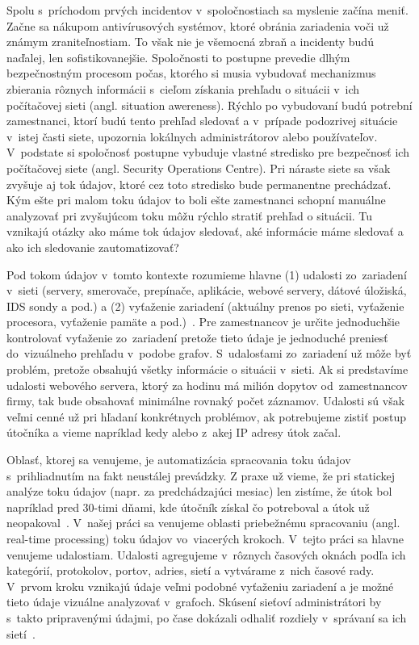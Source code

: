 \documentclass[thesismargins, thesislinespacing, openright, upjsfrontpage]{rnthesis}
\begin{document}
Spolu s~príchodom prvých incidentov v~spoločnostiach sa myslenie začína meniť. Začne sa nákupom antivírusových systémov, ktoré obránia zariadenia voči už známym zraniteľnostiam. To však nie je všemocná zbraň a incidenty budú naďalej, len sofistikovanejšie. Spoločnosti to postupne prevedie dlhým bezpečnostným procesom počas, ktorého si musia vybudovať mechanizmus zbierania rôznych informácii s~cieľom získania prehľadu o situácii v~ich počítačovej sieti (angl. situation awereness). Rýchlo po vybudovaní budú potrební zamestnanci, ktorí budú tento prehľad sledovať a v~prípade podozrivej situácie v~istej časti siete, upozornia lokálnych administrátorov alebo používateľov. V~podstate si spoločnosť postupne vybuduje vlastné stredisko pre bezpečnosť ich počítačovej siete (angl. Security Operations Centre). Pri náraste siete sa však zvyšuje aj tok údajov, ktoré cez toto stredisko bude permanentne prechádzať. Kým ešte pri malom toku údajov to boli ešte zamestnanci schopní manuálne analyzovať pri zvyšujúcom toku môžu rýchlo stratiť prehľad o situácii. Tu vznikajú otázky ako máme tok údajov sledovať, aké informácie máme sledovať a ako ich sledovanie zautomatizovať?

Pod tokom údajov v~tomto kontexte rozumieme hlavne (1) udalosti zo~zariadení v~sieti (servery, smerovače, prepínače, aplikácie, webové servery, dátové úložiská, IDS sondy a pod.) a (2) vyťaženie zariadení (aktuálny prenos po sieti, vyťaženie procesora, vyťaženie pamäte a pod.)~\cite{kent2016cyber}. Pre zamestnancov je určite jednoduchšie kontrolovať vyťaženie zo~zariadení pretože tieto údaje je jednoduché preniesť do~vizuálneho prehľadu v~podobe grafov. S~udalosťami zo~zariadení už môže byť problém, pretože obsahujú všetky informácie o situácii v~sieti. Ak si predstavíme udalosti webového servera, ktorý za hodinu má milión dopytov od~zamestnancov firmy, tak bude obsahovať minimálne rovnaký počet záznamov. Udalosti sú však veľmi cenné už pri hľadaní konkrétnych problémov, ak potrebujeme zistiť postup útočníka a vieme napríklad kedy alebo z~akej IP adresy útok začal. 

Oblasť, ktorej sa venujeme, je automatizácia spracovania toku údajov s~prihliadnutím na fakt neustálej prevádzky. Z praxe už vieme, že pri statickej analýze toku údajov (napr. za predchádzajúci mesiac) len zistíme, že útok bol napríklad pred 30-timi dňami, kde útočník získal čo potreboval a útok už neopakoval~\cite{park2010study}. V~našej práci sa venujeme oblasti priebežnému spracovaniu (angl. real-time processing) toku údajov vo~viacerých krokoch. V~tejto práci sa hlavne venujeme udalostiam. Udalosti agregujeme v~rôznych časových oknách podľa ich kategórií, protokolov, portov, adries, sietí a vytvárame z~nich časové rady. V~prvom kroku vznikajú údaje veľmi podobné vyťaženiu zariadení a je možné tieto údaje vizuálne analyzovať v~grafoch. Skúsení sieťoví administrátori by s~takto pripravenými údajmi, po čase dokázali odhaliť rozdiely v~správaní sa ich sietí~\cite{papagiannaki2005long}.
\end{document}
